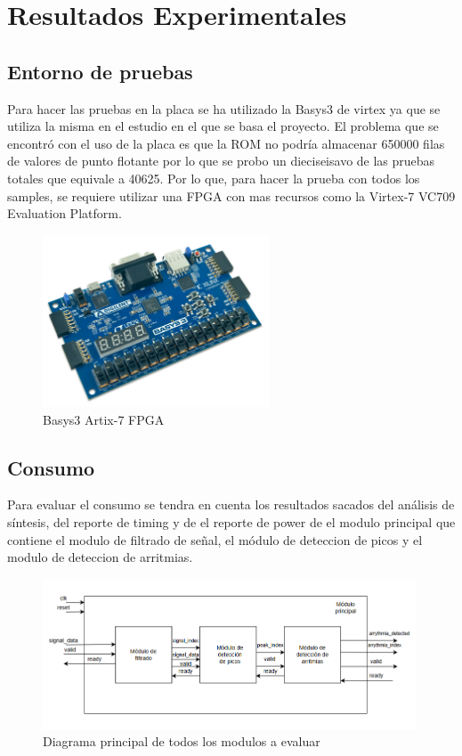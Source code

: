 \chapter{Resultados Experimentales}


\section{Entorno de pruebas}
Para hacer las pruebas en la placa se ha utilizado la Basys3 de virtex ya que se utiliza la misma en el estudio en el que se basa el proyecto.
El problema que se encontró con el uso de la placa es que la ROM no podría almacenar 650000 filas de valores de punto flotante por lo que se probo un dieciseisavo de las pruebas totales que equivale a 40625.
Por lo que, para hacer la prueba con todos los samples, se requiere utilizar una FPGA con mas recursos como la Virtex-7 VC709 Evaluation Platform.

\begin{figure}[h]
	\centering
	\includegraphics[width=0.6\textwidth]{./Images/img_introduccion/Basys3.jpg}
	\caption{Basys3 Artix-7 FPGA}
	\label{fig:Basys3}
\end{figure}

\section{Consumo}
	Para evaluar el consumo se tendra en cuenta los resultados sacados del análisis de síntesis, del reporte de timing y de el reporte de power de el modulo principal que contiene el modulo de filtrado de señal,
	el módulo de deteccion de picos y el modulo de deteccion de arritmias. 
	
	\begin{figure}[h!]
		\centering
		\includegraphics[width=0.99\textwidth]{./Images/img_res_experimentales/diagramaGeneral.png}
		\caption{Diagrama principal de todos los modulos a evaluar}
		\label{fig:Diagramaasmfiltrado}
	\end{figure} 

